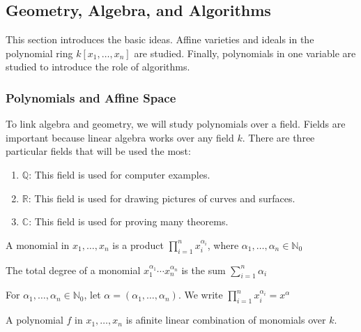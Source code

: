         \subsection{Geometry, Algebra, and Algorithms}
            This section introduces the basic ideas. Affine
            varieties and ideals in the polynomial ring
            $k[x_1,\hdots,x_n]$ are studied. Finally, polynomials
            in one variable are studied to introduce the role
            of algorithms.
            \subsubsection{Polynomials and Affine Space}
                To link algebra and geometry, we will study
                polynomials over a field. Fields are important
                because linear algebra works over any field $k$.
                There are three particular fields that will
                be used the most:
                \begin{enumerate}
                    \item $\mathbb{Q}$: This field is used
                          for computer examples.
                    \item $\mathbb{R}$: This field is used
                          for drawing pictures of curves and surfaces.
                    \item $\mathbb{C}$: This field is used
                          for proving many theorems.
                \end{enumerate}
                \begin{definition}
                    A monomial in $x_1,\hdots,x_n$ is a product
                    $\prod_{i=1}^{n}x_{i}^{\alpha_{i}}$, where
                    $\alpha_{1},\hdots,\alpha_{n}\in\mathbb{N}_0$
                \end{definition}
                \begin{definition}
                    The total degree of a monomial
                    $x_1^{\alpha_1}\cdots x_n^{\alpha_n}$ is
                    the sum $\sum_{i=1}^{n}\alpha_{i}$
                \end{definition}
                For $\alpha_1,\hdots,\alpha_n\in\mathbb{N}_0$, let
                $\alpha=(\alpha_1,\hdots,\alpha_n)$. We write
                $\prod_{i=1}^{n}x_{i}^{\alpha_{i}}=x^{\alpha}$
                \begin{definition}
                    A polynomial $f$ in $x_1,\hdots, x_n$ is afinite linear
                    combination of monomials over $k$.
                \end{definition}
